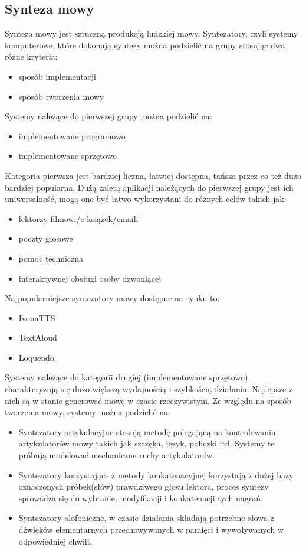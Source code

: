 \subsection{Synteza mowy}   
Synteza mowy jest sztuczną produkcją ludzkiej mowy. Syntezatory, czyli systemy komputerowe, które dokonują syntezy można podzielić na grupy stosując dwa różne kryteria:
\begin{itemize}
	\item sposób implementacji
	\item sposób tworzenia mowy
\end{itemize}
Systemy należące do pierwszej grupy można podzielić na:
\begin{itemize}
	\item implementowane programowo
	\item implementowane sprzętowo
\end{itemize}
Kategoria pierwsza jest bardziej liczna, łatwiej dostępna, tańsza przez co też dużo bardziej popularna. Dużą zaletą aplikacji należących do pierwszej grupy jest ich uniwersalność,  mogą one być łatwo wykorzystani do różnych celów takich jak:
\begin{itemize}
	\item lektorzy filmowi/e-książek/emaili
	\item poczty głosowe
	\item pomoc techniczna
	\item interaktywnej obsługi osoby  dzwoniącej
\end{itemize}
Najpopularniejsze syntezatory mowy dostępne na rynku to:
\begin{itemize}
	\item IvonaTTS
	\item TextAloud
	\item Loquendo
\end{itemize}
Systemy należące do kategorii drugiej (implementowane sprzętowo) charakteryzują się dużo większą wydajnością i szybkością działania. Najlepsze z nich są w stanie generować mowę w czasie rzeczywistym. 
Ze względu na sposób tworzenia mowy, systemy można podzielić na:
\begin{itemize}
	\item Syntezatory artykulacyjne stosują metodę polegającą na kontrolowaniu artykulatorów mowy takich jak szczęka, język, policzki itd. Systemy te próbują modelować mechaniczne ruchy artykulatorów.
	\item Syntezatory korzystające z metody konkatenacyjnej korzystają z dużej bazy oznaczonych próbek(słów) prawdziwego głosu lektora, proces syntezy sprowadza się do wybranie, modyfikacji i konkatenacji tych nagrań. 
	\item Syntezatory alofoniczne, w czasie działania składają potrzebne słowa z dźwięków elementarnych przechowywanych w pamięci i wywoływanych w odpowiedniej chwili. 
\end{itemize}
